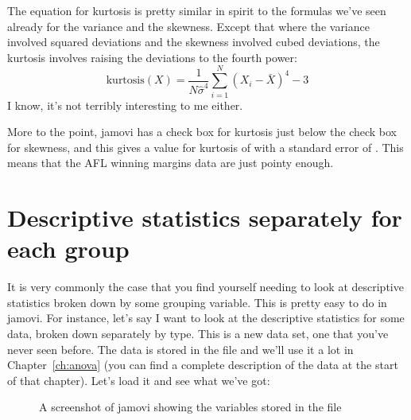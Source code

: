 \vspace{0.5cm}
\begin{mdframed}[style=MyFrame,nobreak=true]
The equation for kurtosis is pretty similar in spirit to the formulas we've seen already for the variance and the skewness. Except that where the variance involved squared deviations and the skewness involved cubed deviations, the kurtosis involves raising the deviations to the fourth power:
$$
\mbox{kurtosis}(X) = \frac{1}{N \hat\sigma^4} \sum_{i=1}^N \left( X_i - \bar{X} \right)^4  - 3
$$
I know, it's not terribly interesting to me either. 
\end{mdframed}

More to the point, jamovi has a check box for kurtosis just below the check box for skewness, and this gives a value for kurtosis of  with a standard error of . This means that the AFL winning margins data are just pointy enough.


\section{Descriptive statistics separately for each group~\label{sec:groupdescriptives}}

It is very commonly the case that you find yourself needing to look at descriptive statistics broken down by some grouping variable. This is pretty easy to do in jamovi. For instance, let's  say I want to look at the descriptive statistics for some  data, broken down separately by  type. This is a new data set, one that you've never seen before. The data is stored in the  file and we'll use it a lot in Chapter~\ref{ch:anova} (you can find a complete description of the data at the start of that chapter). Let's load it and see what we've got:

\vspace{0.5cm}
\begin{figure}[ht]
\begin{center}
\caption{A screenshot of jamovi showing the variables stored in the  file}
\label{fig:clinicaltrial}
\HR
\end{center}
\end{figure}

